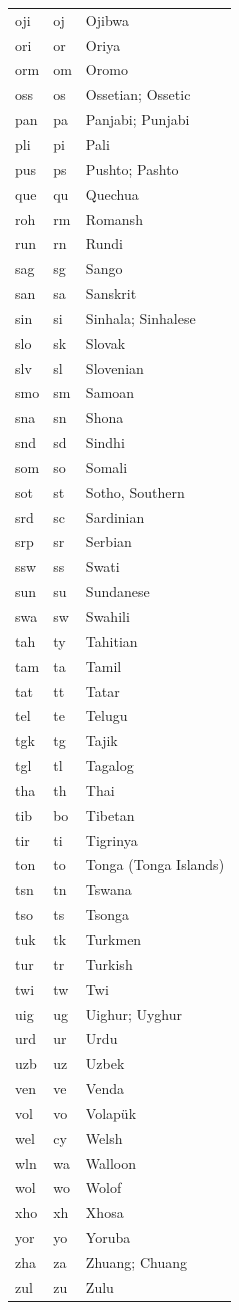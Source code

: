 \begin{longtable}{|L{3cm}|L{3cm}|L{5cm}|}
oji & oj & Ojibwa\\
ori & or & Oriya\\
orm & om & Oromo\\
oss & os & Ossetian; Ossetic\\
pan & pa & Panjabi; Punjabi\\
pli & pi & Pali\\
pus & ps & Pushto; Pashto\\
que & qu & Quechua\\
roh & rm & Romansh\\
run & rn & Rundi\\
sag & sg & Sango\\
san & sa & Sanskrit\\
sin & si & Sinhala; Sinhalese\\
slo & sk & Slovak\\
slv & sl & Slovenian\\
smo & sm & Samoan\\
sna & sn & Shona\\
snd & sd & Sindhi\\
som & so & Somali\\
sot & st & Sotho, Southern\\
srd & sc & Sardinian\\
srp & sr & Serbian\\
ssw & ss & Swati\\
sun & su & Sundanese\\
swa & sw & Swahili\\
tah & ty & Tahitian\\
tam & ta & Tamil\\
tat & tt & Tatar\\
tel & te & Telugu\\
tgk & tg & Tajik\\
tgl & tl & Tagalog\\
tha & th & Thai\\
tib & bo & Tibetan\\
tir & ti & Tigrinya\\
ton & to & Tonga (Tonga Islands)\\
tsn & tn & Tswana\\
tso & ts & Tsonga\\
tuk & tk & Turkmen\\
tur & tr & Turkish\\
twi & tw & Twi\\
uig & ug & Uighur; Uyghur\\
urd & ur & Urdu\\
uzb & uz & Uzbek\\
ven & ve & Venda\\
vol & vo & Volapük\\
wel & cy & Welsh\\
wln & wa & Walloon\\
wol & wo & Wolof\\
xho & xh & Xhosa\\
yor & yo & Yoruba\\
zha & za & Zhuang; Chuang\\
zul & zu & Zulu\\
\end{longtable}
\FloatBarrier
%

